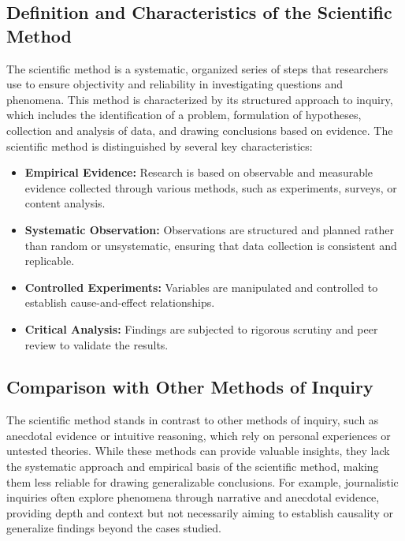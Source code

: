 \documentclass[
]{book}
\providecommand{\tightlist}{%
  \setlength{\itemsep}{0pt}\setlength{\parskip}{0pt}}
\begin{document}
\hypertarget{definition-and-characteristics-of-the-scientific-method}{%
\subsection*{Definition and Characteristics of the Scientific Method}\label{definition-and-characteristics-of-the-scientific-method}}

The scientific method is a systematic, organized series of steps that researchers use to ensure objectivity and reliability in investigating questions and phenomena. This method is characterized by its structured approach to inquiry, which includes the identification of a problem, formulation of hypotheses, collection and analysis of data, and drawing conclusions based on evidence. The scientific method is distinguished by several key characteristics:

\begin{itemize}
\tightlist
\item
  \textbf{Empirical Evidence:} Research is based on observable and measurable evidence collected through various methods, such as experiments, surveys, or content analysis.
\item
  \textbf{Systematic Observation:} Observations are structured and planned rather than random or unsystematic, ensuring that data collection is consistent and replicable.
\item
  \textbf{Controlled Experiments:} Variables are manipulated and controlled to establish cause-and-effect relationships.
\item
  \textbf{Critical Analysis:} Findings are subjected to rigorous scrutiny and peer review to validate the results.
\end{itemize}

\hypertarget{comparison-with-other-methods-of-inquiry}{%
\subsection*{Comparison with Other Methods of Inquiry}\label{comparison-with-other-methods-of-inquiry}}

The scientific method stands in contrast to other methods of inquiry, such as anecdotal evidence or intuitive reasoning, which rely on personal experiences or untested theories. While these methods can provide valuable insights, they lack the systematic approach and empirical basis of the scientific method, making them less reliable for drawing generalizable conclusions. For example, journalistic inquiries often explore phenomena through narrative and anecdotal evidence, providing depth and context but not necessarily aiming to establish causality or generalize findings beyond the cases studied.
\end{document}
